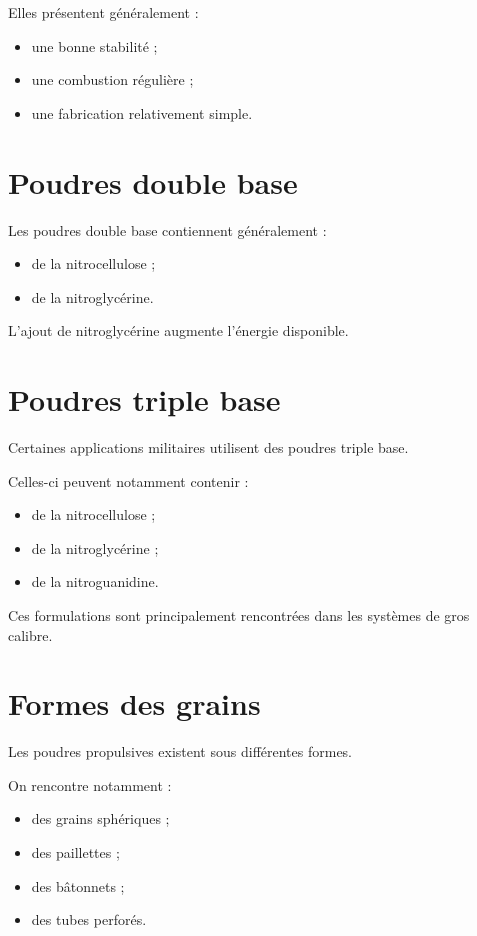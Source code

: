 Elles présentent généralement :

\begin{itemize}
    \item une bonne stabilité ;
    \item une combustion régulière ;
    \item une fabrication relativement simple.
\end{itemize}

\section{Poudres double base}

Les poudres double base contiennent généralement :

\begin{itemize}
    \item de la nitrocellulose ;
    \item de la nitroglycérine.
\end{itemize}

L'ajout de nitroglycérine augmente l'énergie disponible.

\section{Poudres triple base}

Certaines applications militaires utilisent des poudres triple base.

Celles-ci peuvent notamment contenir :

\begin{itemize}
    \item de la nitrocellulose ;
    \item de la nitroglycérine ;
    \item de la nitroguanidine.
\end{itemize}

Ces formulations sont principalement rencontrées dans les systèmes de gros
calibre.

\section{Formes des grains}

Les poudres propulsives existent sous différentes formes.

On rencontre notamment :

\begin{itemize}
    \item des grains sphériques ;
    \item des paillettes ;
    \item des bâtonnets ;
    \item des tubes perforés.
\end{itemize}

